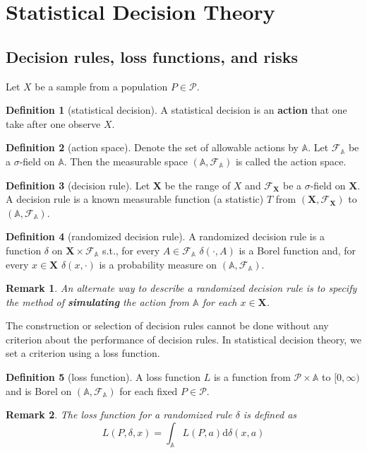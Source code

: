 \documentclass{article}
\newtheorem*{Rk}{Remark}
\theoremstyle{definition}
\newtheorem{Def}{Definition}[section]
\begin{document}
\section{Statistical Decision Theory}
\subsection{Decision rules, loss functions, and risks}
Let $X$ be a sample from a population $P\in\mathcal{P}$. 
\begin{Def}[statistical decision]
A statistical decision is an \textbf{action} that one take after one observe $X$.
\end{Def}
\begin{Def}[action space]
Denote the set of allowable actions by $\mathbb{A}$. Let $\mathcal{F}_\mathbb{A}$ be a $\sigma$-field on $\mathbb{A}$. Then the measurable space $(\mathbb{A},\mathcal{F}_\mathbb{A})$ is called the action space.
\end{Def}
\begin{Def}[decision rule]
Let $\mathbf{X}$ be the range of $X$ and $\mathcal{F}_\mathbf{X}$ be a $\sigma$-field on $\mathbf{X}$. A decision rule is a known measurable function (a statistic) $T$ from $(\mathbf{X},\mathcal{F}_\mathbf{X})$ to $(\mathbb{A},\mathcal{F}_\mathbb{A})$.
\end{Def}
\begin{Def}[randomized decision rule]
A randomized decision rule is a function $\delta$ on $\mathbf{X}\times\mathcal{F}_\mathbb{A}$ s.t., for every $A\in\mathcal{F}_\mathbb{A}$ $\delta(\cdot,A)$ is a Borel function and, for every $x\in\mathbf{X}$ $\delta(x,\cdot)$ is a probability measure on $(\mathbb{A},\mathcal{F}_\mathbb{A})$.
\end{Def}
\begin{Rk}
An alternate way to describe a randomized decision rule is to specify the method of \textbf{simulating} the action from $\mathbb{A}$ for each $x\in\mathbf{X}$.
\end{Rk}
The construction or selection of decision rules cannot be done without any criterion about the performance of decision rules. In statistical decision theory, we set a criterion using a loss function.
\begin{Def}[loss function]
A loss function $L$ is a function from $\mathcal{P}\times\mathbb{A}$ to $[0,\infty)$ and is Borel on $(\mathbb{A},\mathcal{F}_\mathbb{A})$ for each fixed $P\in\mathcal{P}$.
\end{Def}
\begin{Rk}
The loss function for a randomized rule $\delta$ is defined as \[L(P,\delta,x)=\int_\mathbb{A}L(P,a)\mathrm{d}\delta(x,a)\]
\end{Rk}
\end{document}
